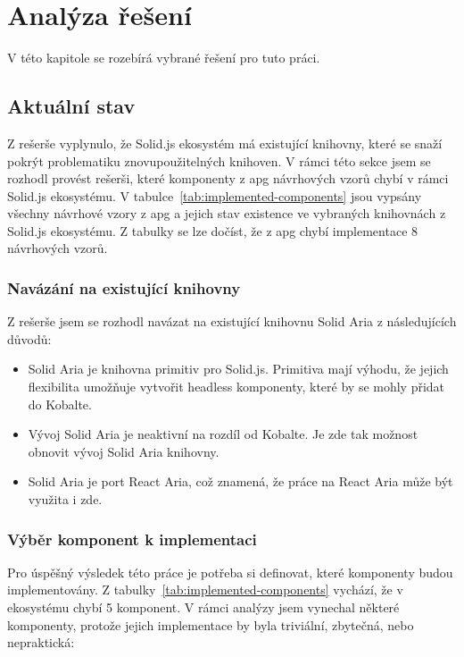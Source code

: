 \chapter{Analýza řešení}
\label{chap:analysis}

V této kapitole se rozebírá vybrané řešení pro tuto práci.

\section{Aktuální stav}

Z rešerše vyplynulo, že Solid.js ekosystém má existující knihovny, které se snaží pokrýt problematiku znovupoužitelných knihoven.
V rámci této sekce jsem se rozhodl provést rešerši, které komponenty z \gls{apg} návrhových vzorů chybí v rámci Solid.js ekosystému.
V tabulce~\ref{tab:implemented-components} jsou vypsány všechny návrhové vzory z \gls{apg} a jejich stav existence ve vybraných knihovnách z Solid.js ekosystému.
Z tabulky se lze dočíst, že z \gls{apg} chybí implementace 8 návrhových vzorů.

\subsection{Navázání na existující knihovny}

Z rešerše jsem se rozhodl navázat na existující knihovnu Solid Aria z následujících důvodů:

\begin{itemize}
      \item Solid Aria je knihovna primitiv pro Solid.js. Primitiva mají výhodu, že jejich flexibilita umožňuje vytvořit headless komponenty, které by se mohly přidat do Kobalte.
      \item Vývoj Solid Aria je neaktivní na rozdíl od Kobalte. Je zde tak možnost obnovit vývoj Solid Aria knihovny.
      \item Solid Aria je port React Aria, což znamená, že práce na React Aria může být využita i zde.
\end{itemize}

\subsection{Výběr komponent k implementaci}

Pro úspěšný výsledek této práce je potřeba si definovat, které komponenty budou implementovány.
Z tabulky~\ref{tab:implemented-components} vychází, že v ekosystému chybí 5 komponent.
V rámci analýzy jsem vynechal některé komponenty, protože jejich implementace by byla triviální, zbytečná, nebo nepraktická:

